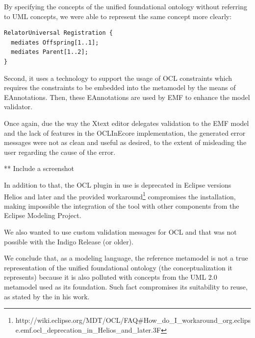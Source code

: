 \documentclass[
  10pt,				%
  oneside,
  a4paper,			%
  brazilian,
  english
]{abntex2}
\begin{document}
By specifying the concepts of the unified foundational ontology without referring
to UML concepts, we were able to represent the same concept more clearly:

\begin{verbatim}
RelatorUniversal Registration {
  mediates Offspring[1..1];
  mediates Parent[1..2];
}
\end{verbatim}

Second, it uses a technology to support the usage of OCL constraints which requires
the constraints to be embedded into the metamodel by the means of EAnnotations.
Then, these EAnnotations are used by EMF to enhance the model validator.

Once again, due the way the Xtext editor delegates validation to the EMF model and
the lack of features in the OCLInEcore implementation, the generated error messages
were not as clean and useful as desired, to the extent of misleading the user
regarding the cause of the error.

** Include a screenshot

In addition to that, the OCL plugin in use is deprecated in Eclipse versions Helios
and later and the provided workaround\footnote{http://wiki.eclipse.org/MDT/OCL/FAQ\#How\_do\_I\_workaround\_org.eclipse.emf.ocl\_deprecation\_in\_Helios\_and\_later.3F} compromises the installation, making impossible the integration
of the tool with other components from the Eclipse Modeling Project.

We also wanted to use custom validation messages for OCL and that was not possible
with the Indigo Release (or older).





We conclude that, as a modeling language, the reference metamodel is not a true
representation of the unified foundational ontology (the conceptualization it represents)
because it is also polluted with concepts from the UML 2.0 metamodel used as its foundation.
Such fact compromises its suitability to reuse, as stated by the \cite{carraretto10} in his work.
\end{document}

